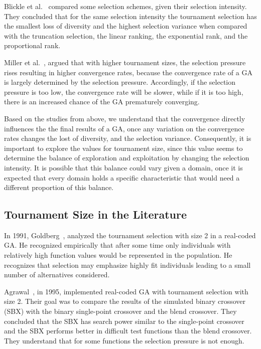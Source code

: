 Blickle et al.~\cite{blickle1995comparison} compared some selection schemes, given their selection intensity. They concluded that for the same selection intensity the tournament selection has the smallest loss of diversity and the highest selection variance when compared with the truncation selection, the linear ranking, the exponential rank, and the proportional rank.

Miller et al.~\cite{miller1995genetic}, argued that with higher tournament sizes, the selection pressure rises resulting in higher convergence rates, because the convergence rate of a GA is largely determined by the selection pressure.  Accordingly, if the selection pressure is too low, the convergence rate will be slower, while if it is too high, there is an increased chance of the GA prematurely converging.

Based on the studies from above, we understand that the convergence directly influences the the final results of a GA, once any variation on the convergence rates changes the lost of diversity, and the selection variance. Consequently, it is important to explore the values for tournament size, since this value seems to determine the balance of exploration and exploitation by changing the selection intensity. It is possible that this balance could vary given a domain, once it is expected that every domain holds a specific characteristic that would need a different proportion of this balance.

\subsection{Tournament Size in the Literature}\label{sec:background:tournament_size} 

In 1991, Goldberg~\cite{goldberg1991real}, analyzed the tournament selection with size 2 in a real-coded GA. He recognized empirically that after some time only individuals with relatively high function values would be represented in the population. He recognizes that selection may emphasize highly fit individuals leading to a small number of alternatives considered.

Agrawal~\cite{agrawal1995simulated}, in 1995, implemented real-coded GA with tournament selection with size 2. Their goal was to compare the results of the simulated binary crossover (SBX) with the binary single-point crossover and the blend crossover. They concluded that the SBX has search power similar to the single-point crossover and the SBX performs better in difficult test functions than the blend crossover. They understand that for some functions the selection pressure is not enough.

